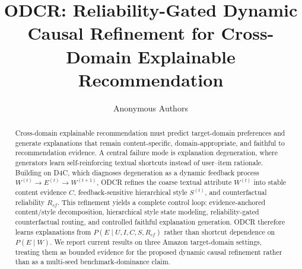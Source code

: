 \documentclass[11pt]{article}
\title{ODCR: Reliability-Gated Dynamic Causal Refinement for Cross-Domain Explainable Recommendation}
\author{Anonymous Authors}
\date{}
\begin{document}
\maketitle

\begin{abstract}
Cross-domain explainable recommendation must predict target-domain preferences
and generate explanations that remain content-specific, domain-appropriate, and
faithful to recommendation evidence. A central failure mode is explanation
degeneration, where generators learn self-reinforcing textual shortcuts instead
of user--item rationale. Building on D4C, which diagnoses degeneration as a
dynamic feedback process \(W^{(t)} \rightarrow E^{(t)} \rightarrow
W^{(t+1)}\), ODCR refines the coarse textual attribute \(W^{(t)}\) into stable
content evidence \(C\), feedback-sensitive hierarchical style \(S^{(t)}\), and
counterfactual reliability \(R_{cf}\). This refinement yields a complete
control loop: evidence-anchored content/style decomposition, hierarchical style
state modeling, reliability-gated counterfactual routing, and controlled
faithful explanation generation. ODCR therefore learns explanations from
\(P(E\mid U,I,C,S,R_{cf})\) rather than shortcut dependence on \(P(E\mid W)\).
We report current results on three Amazon target-domain settings, treating
them as bounded evidence for the proposed dynamic causal refinement rather
than as a multi-seed benchmark-dominance claim.
\end{abstract}












\end{document}
